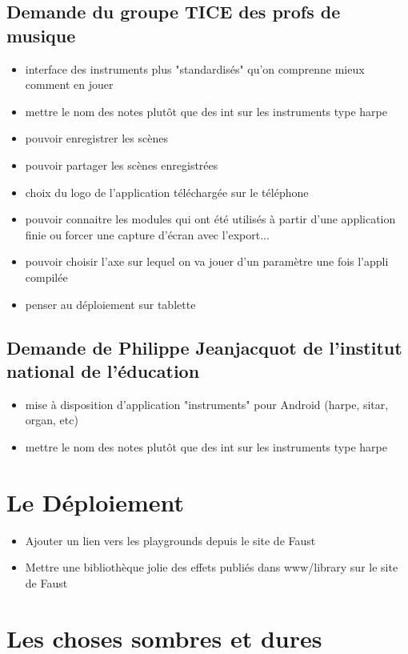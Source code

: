 \documentclass[a4paper]{article}
\begin{document}
\subsection{Demande du groupe TICE des profs de musique}
\begin{itemize}
\item interface des instruments plus "standardisés" qu'on comprenne mieux comment en jouer
\item mettre le nom des notes plutôt que des int sur les instruments type harpe
\item pouvoir enregistrer les scènes
\item pouvoir partager les scènes enregistrées
\item choix du logo de l'application téléchargée sur le téléphone
\item pouvoir connaitre les modules qui ont été utilisés à partir d'une application finie ou forcer une capture d'écran avec l'export...
\item pouvoir choisir l'axe sur lequel on va jouer d'un paramètre une fois l'appli compilée
\item penser au déploiement sur tablette
\end{itemize}

\subsection{Demande de Philippe Jeanjacquot de l'institut national de l'éducation}
\begin{itemize}
\item mise à disposition d'application "instruments" pour Android (harpe, sitar, organ, etc)
\item mettre le nom des notes plutôt que des int sur les instruments type harpe
\end{itemize}

\section{Le Déploiement}

\begin{itemize}
\item Ajouter un lien vers les playgrounds depuis le site de Faust
\item Mettre une bibliothèque jolie des effets publiés dans www/library sur le site de Faust
\end{itemize}

\section{Les choses sombres et dures}
\end{document}
